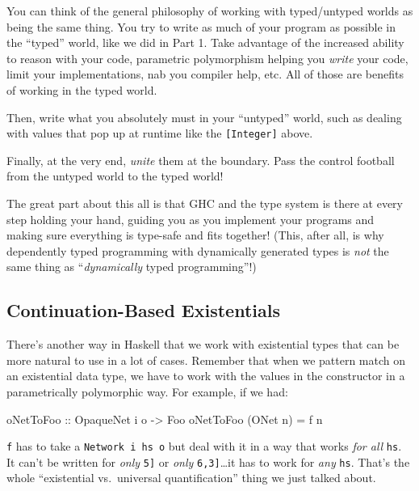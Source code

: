 \documentclass[]{article}
\newenvironment{Shaded}{}{}
\newcommand{\DataTypeTok}[1]{\textcolor[rgb]{0.56,0.13,0.00}{{#1}}}
\newcommand{\OtherTok}[1]{\textcolor[rgb]{0.00,0.44,0.13}{{#1}}}
\newcommand{\FunctionTok}[1]{\textcolor[rgb]{0.02,0.16,0.49}{{#1}}}
\newcommand{\NormalTok}[1]{{#1}}
\begin{document}
You can think of the general philosophy of working with typed/untyped worlds as
being the same thing. You try to write as much of your program as possible in
the ``typed'' world, like we did in Part 1. Take advantage of the increased
ability to reason with your code, parametric polymorphism helping you
\emph{write} your code, limit your implementations, nab you compiler help, etc.
All of those are benefits of working in the typed world.

Then, write what you absolutely must in your ``untyped'' world, such as dealing
with values that pop up at runtime like the \texttt{{[}Integer{]}} above.

Finally, at the very end, \emph{unite} them at the boundary. Pass the control
football from the untyped world to the typed world!

The great part about this all is that GHC and the type system is there at every
step holding your hand, guiding you as you implement your programs and making
sure everything is type-safe and fits together! (This, after all, is why
dependently typed programming with dynamically generated types is \emph{not} the
same thing as ``\emph{dynamically} typed programming''!)

\subsection{Continuation-Based
Existentials}\label{continuation-based-existentials}

There's another way in Haskell that we work with existential types that can be
more natural to use in a lot of cases. Remember that when we pattern match on an
existential data type, we have to work with the values in the constructor in a
parametrically polymorphic way. For example, if we had:

\begin{Shaded}
\begin{Highlighting}[]
\OtherTok{oNetToFoo ::} \DataTypeTok{OpaqueNet} \NormalTok{i o }\OtherTok{->} \DataTypeTok{Foo}
\NormalTok{oNetToFoo (}\DataTypeTok{ONet} \NormalTok{n) }\FunctionTok{=} \NormalTok{f n}
\end{Highlighting}
\end{Shaded}

\texttt{f} has to take a \texttt{Network\ i\ hs\ o} but deal with it in a way
that works \emph{for all} \texttt{hs}. It can't be written for \emph{only}
\texttt{\textquotesingle{}{[}5{]}} or \emph{only}
\texttt{\textquotesingle{}{[}6,3{]}}\ldots{}it has to work for \emph{any}
\texttt{hs}. That's the whole ``existential vs.~universal quantification'' thing
we just talked about.
\end{document}
